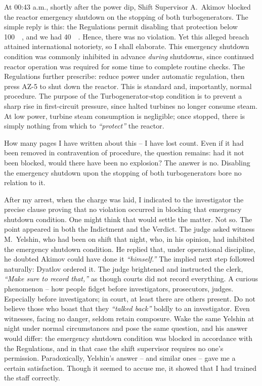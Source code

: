 \documentclass[openright]{bookest}
\begin{document}
At 00:43 a.m., shortly after the power dip, Shift Supervisor A.~Akimov blocked the reactor emergency shutdown on the stopping of both turbogenerators. The simple reply is this: the Regulations permit disabling that protection below \qty{100}{\mega\We}, and we had \qty{40}{\mega\We}. Hence, there was no violation. Yet this alleged breach attained international notoriety, so I shall elaborate. This emergency shutdown condition was commonly inhibited in advance \textit{during} shutdowns, since continued reactor operation was required for some time to complete routine checks. The Regulations further prescribe: reduce power under automatic regulation, then press AZ-5 to shut down the reactor. This is standard and, importantly, normal procedure. The purpose of the Turbogenerator-stop condition is to prevent a sharp rise in first-circuit pressure, since halted turbines no longer consume steam. At low power, turbine steam consumption is negligible; once stopped, there is simply nothing from which to \textit{``protect''} the reactor.

How many pages I have written about this -- I have lost count. Even if it had been removed in contravention of procedure, the question remains: had it not been blocked, would there have been no explosion? The answer is no. Disabling the emergency shutdown upon the stopping of both turbogenerators bore no relation to it.

After my arrest, when the charge was laid, I indicated to the investigator the precise clause proving that no violation occurred in blocking that emergency shutdown condition. One might think that would settle the matter. Not so. The point appeared in both the Indictment and the Verdict. The judge asked witness M.~Yelshin, who had been on shift that night, who, in his opinion, had inhibited the emergency shutdown condition. He replied that, under operational discipline, he doubted Akimov could have done it \textit{``himself.''} The implied next step followed naturally: Dyatlov ordered it. The judge brightened and instructed the clerk, \textit{``Make sure to record that,''} as though courts did not record everything. A curious phenomenon -- how people fidget before investigators, prosecutors, judges. Especially before investigators; in court, at least there are others present. Do not believe those who boast that they \textit{``talked back''} boldly to an investigator. Even witnesses, facing no danger, seldom retain composure. Wake the same Yelshin at night under normal circumstances and pose the same question, and his answer would differ: the emergency shutdown condition was blocked in accordance with the Regulations, and in that case the shift supervisor requires no one's permission. Paradoxically, Yelshin's answer -- and similar ones -- gave me a certain satisfaction. Though it seemed to accuse me, it showed that I had trained the staff correctly.
\end{document}
